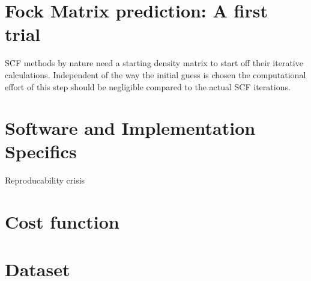 \section{Fock Matrix prediction: A first trial}
\label{sec:first_predictions}
SCF methods by nature need a starting density matrix to start off their iterative calculations. Independent of the way the initial guess is chosen the computational effort of this step should be negligible compared to the actual SCF iterations. 


\subsection{}

\section{Software and Implementation Specifics}
\label{sec:software_and_implementation}
Reproducability crisis
\section{Cost function}
\section{Dataset}
